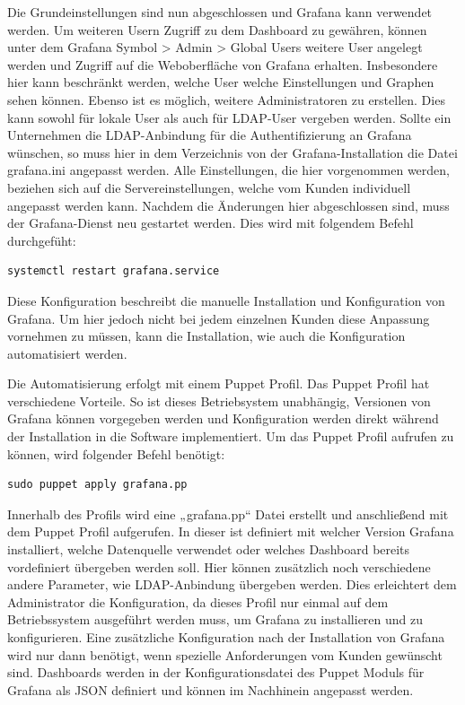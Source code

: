 Die Grundeinstellungen sind nun abgeschlossen und Grafana kann verwendet
werden. Um weiteren Usern Zugriff zu dem Dashboard zu gewähren, können unter
dem Grafana Symbol > Admin > Global Users weitere User angelegt werden und
Zugriff auf die Weboberfläche von Grafana erhalten. Insbesondere hier kann
beschränkt werden, welche User welche Einstellungen und Graphen sehen können.
Ebenso ist es möglich, weitere Administratoren zu erstellen. Dies kann sowohl
für lokale User als auch für LDAP-User vergeben werden.  Sollte ein Unternehmen
die LDAP-Anbindung für die Authentifizierung an Grafana wünschen, so muss hier
in dem Verzeichnis von der Grafana-Installation die Datei grafana.ini angepasst
werden. Alle Einstellungen, die hier vorgenommen werden, beziehen sich auf die
Servereinstellungen, welche vom Kunden individuell angepasst werden kann.
Nachdem die Änderungen hier abgeschlossen sind, muss der Grafana-Dienst neu
gestartet werden. Dies wird mit folgendem Befehl durchgefüht:

\begin{verbatim}
systemctl restart grafana.service
\end{verbatim}

Diese Konfiguration beschreibt die manuelle Installation und Konfiguration von
Grafana. Um hier jedoch nicht bei jedem einzelnen Kunden diese Anpassung
vornehmen zu müssen, kann die Installation, wie auch die Konfiguration
automatisiert werden.

Die Automatisierung erfolgt mit einem Puppet Profil. Das Puppet Profil hat
verschiedene Vorteile. So ist dieses Betriebsystem unabhängig, Versionen von
Grafana können vorgegeben werden und Konfiguration werden direkt während der
Installation in die Software implementiert. Um das Puppet Profil aufrufen zu
können, wird folgender Befehl benötigt:

\begin{verbatim}
sudo puppet apply grafana.pp
\end{verbatim}

Innerhalb des Profils wird eine „grafana.pp“ Datei erstellt und anschließend
mit dem Puppet Profil aufgerufen. In dieser ist definiert mit welcher Version
Grafana installiert, welche Datenquelle verwendet oder welches Dashboard
bereits vordefiniert übergeben werden soll. Hier können zusätzlich noch
verschiedene andere Parameter, wie LDAP-Anbindung übergeben werden. Dies
erleichtert dem Administrator die Konfiguration, da dieses Profil nur einmal
auf dem Betriebssystem ausgeführt werden muss, um Grafana zu installieren und
zu konfigurieren. Eine zusätzliche Konfiguration nach der Installation von
Grafana wird nur dann benötigt, wenn spezielle Anforderungen vom Kunden
gewünscht sind. Dashboards werden in der Konfigurationsdatei des Puppet Moduls
für Grafana als \gls{JSON} definiert und können im Nachhinein angepasst werden.

